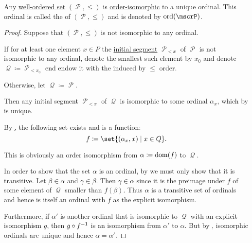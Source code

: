 \begin{proposition}\label{thm:order_type_existence}
  Any \hyperref[def:well_ordered_set]{well-ordered set} \( (\mscrP, \leq) \) is \hyperref[def:poset/homomorphism]{order-isomorphic} to a unique ordinal. This ordinal is called the  of \( (\mscrP, \leq) \) and is denoted by \( \ord(\mscrP) \).
\end{proposition}
\begin{proof}
  Suppose that \( (\mscrP, \leq) \) is not isomorphic to any ordinal.

  If for at least one element \( x \in P \) the \hyperref[def:poset_interval/ray]{initial segment} \( \mscrP_{<x} \) of \( \mscrP \) is not isomorphic to any ordinal, denote the smallest such element by \( x_0 \) and denote \( \mscrQ \coloneqq \mscrP_{<x_0} \) end endow it with the induced by \( \leq \) order.

  Otherwise, let \( \mscrQ \coloneqq \mscrP \).

  Then any initial segment \( \mscrP_{<x} \) of \( \mscrQ \) is isomorphic to some ordinal \( \alpha_x \), which by  is unique.

  By \hyperref[def:zfc/choice], the following set exists and is a function:
  \begin{equation*}
    f \coloneqq \set{ (\alpha_x, x) \given x \in Q }.
  \end{equation*}

  This is obviously an order isomorphism from \( \alpha \coloneqq \operatorname{dom}(f) \) to \( \mscrQ \).

  In order to show that the set \( \alpha \) is an ordinal, by  we must only show that it is transitive. Let \( \beta \in \alpha \) and \( \gamma \in \beta \). Then \( \gamma \in \alpha \) since it is the preimage under \( f \) of some element of \( \mscrQ \) smaller than \( f(\beta) \). Thus \( \alpha \) is a transitive set of ordinals and hence is itself an ordinal with \( f \) as the explicit isomorphism.

  Furthermore, if \( \alpha' \) is another ordinal that is isomorphic to \( \mscrQ \) with an explicit isomorphism \( g \), then \( g \mathbin \circ f^{-1} \) is an isomorphism from \( \alpha' \) to \( \alpha \). But by , isomorphic ordinals are unique and hence \( \alpha = \alpha' \).
\end{proof}
